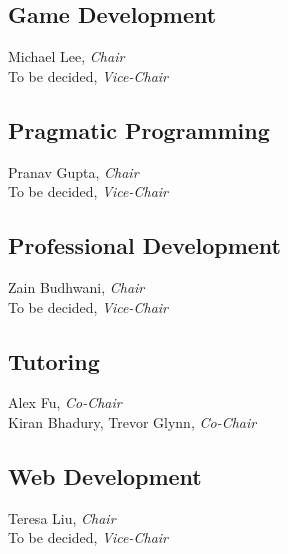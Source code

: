 \documentclass[10pt]{article}
\newcommand{\chair}[1]{#1, \textit{Chair}}
\newcommand{\vicechair}[1]{#1, \textit{Vice-Chair}}
\newcommand{\cochair}[1]{#1, \textit{Co-Chair}}
\begin{document}
\subsection{Game Development}

\chair{Michael Lee}\\
\vicechair{To be decided}

\subsection{Pragmatic Programming}

\chair{Pranav Gupta}\\
\vicechair{To be decided}

\subsection{Professional Development}

\chair{Zain Budhwani}\\
\vicechair{To be decided}

\subsection{Tutoring}

\cochair{Alex Fu}\\
\cochair{Kiran Bhadury, Trevor Glynn}

\subsection{Web Development}

\chair{Teresa Liu}\\
\vicechair{To be decided}
\end{document}
